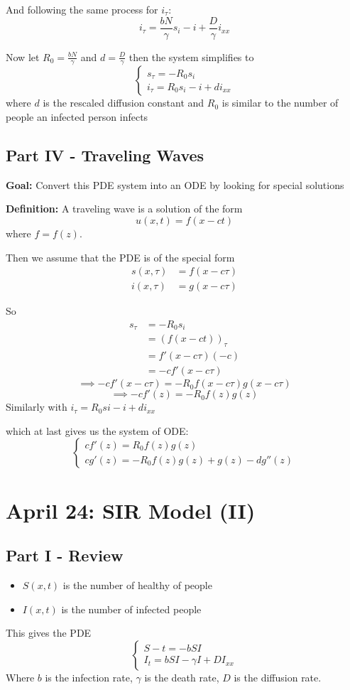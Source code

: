 \documentclass[12pt]{article}
\begin{document}
And following the same process for $i_\tau$:
\[i_\tau = \frac{bN}{\gamma}s_i - i + \frac{D}{\gamma}i_{xx}\]

Now let $R_0 = \frac{bN}{\gamma}$ and $d = \frac{D}{\gamma}$ then the system simplifies to 
\[\boxed{\begin{cases}
    s_\tau = -R_0 s_i\\
    i_\tau = R_0 s_i - i + di_{xx}
\end{cases}}\]
where $d$ is the rescaled diffusion constant and $R_0$ is similar to the number of people an infected person infects 

\subsection*{Part IV - Traveling Waves}
\textbf{Goal:} Convert this PDE system into an ODE by looking for special solutions

\textbf{Definition:} A traveling wave is a solution of the form 
\[u(x, t) = f(x - ct)\]
where $f = f(z)$. 

Then we assume that the PDE is of the special form 
\begin{align*}
    s(x, \tau) &=f(x - c\tau)\\
    i(x, \tau) &= g(x - c\tau)
\end{align*}

So 
\begin{align*}
    s_\tau &= -R_0 s_i\\
    &= (f(x - ct))_\tau\\
    &= f'(x-c\tau)(-c)\\
    &= -cf'(x- c\tau)
\end{align*}
\[\implies -cf'(x- c\tau) = -R_0 f(x - c\tau)g(x - c\tau)\]
\[\implies -cf'(z) = -R_0 f(z)g(z)\]
Similarly with $i_\tau = R_0 si - i + di_{xx}$

which at last gives us the system of ODE:
\[\boxed{\begin{cases}
    cf'(z) = R_0f(z)g(z)\\
    cg'(z) = -R_0 f(z)g(z) + g(z) - dg''(z)
\end{cases}}\]

\section{April 24: SIR Model (II)}
\subsection*{Part I - Review}
\begin{itemize}
    \item $S(x, t)$ is the number of healthy of people
    \item $I(x, t)$ is the number of infected people 
\end{itemize}
This gives the PDE 
\[\begin{cases}
    S-t = -bSI\\
    I_t = bSI - \gamma I + DI_{xx}
\end{cases}\]
Where $b$ is the infection rate, $\gamma$ is the death rate, $D$ is the diffusion rate.
\end{document}
